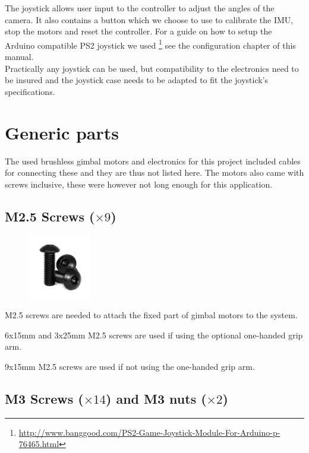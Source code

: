 The joystick allows user input to the controller to adjust the angles of the camera. It also contains a button which we choose to use to calibrate the IMU, stop the motors and reset the controller.
For a guide on how to setup the Arduino compatible PS2 joystick we used \footnote{\url{http://www.banggood.com/PS2-Game-Joystick-Module-For-Arduino-p-76465.html}} see the configuration chapter of this manual.\\

\raisebox{-0.2cm}{\hspace{-1.5cm}\Huge\Info}\normalsize \quad Practically any joystick can be used, but compatibility to the electronics need to be insured and the joystick case needs to be adapted to fit the joystick’s specifications. 


\section{Generic parts}
The used brushless gimbal motors and electronics for this project included cables for connecting these and they are thus not listed here. The motors also came with screws inclusive, these were however not long enough for this application.

\subsection{M2.5 Screws ($\times9$)}

\begin{figure}
    \vspace{-1.5cm}
    \includegraphics[width=0.25\textwidth]{GenericParts/M25Screws.jpg}
\end{figure}

M2.5 screws are needed to attach the fixed part of gimbal motors to the system.

6x15mm and 3x25mm M2.5 screws are used if using the optional one-handed grip arm.

9x15mm M2.5 screws are used if not using the one-handed grip arm.


\subsection{M3 Screws ($\times14$) and M3 nuts ($\times2$)}

